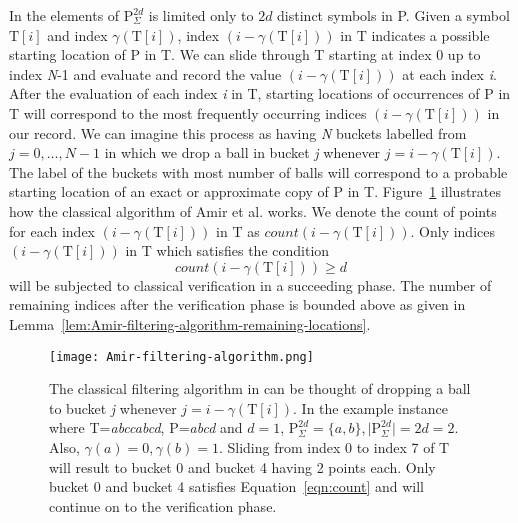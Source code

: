 In \cite{Amir2004} the elements of $\text{P}_{\Sigma}^{2d}$ is limited only to $2d$ distinct symbols in P. Given a symbol $\mathrm{T}[i]$ and index $\gamma(\mathrm{T}[i])$, index $(i - \gamma(\mathrm{T}[i]))$ in T indicates a possible starting location of P in T. We can slide through T starting at index 0 up to index \textit{N}-1 and evaluate and record the value $(i - \gamma(\mathrm{T}[i]))$ at each index \textit{i}. After the evaluation of each index \textit{i} in T, starting locations of occurrences of P in T will correspond to the most frequently occurring indices $(i - \gamma(\mathrm{T}[i]))$ in our record. We can imagine this process as having \textit{N} buckets labelled from $j=0,\ldots,N-1$ in which we drop a ball in bucket \textit{j} whenever $j=i-\gamma(\mathrm{T}[i])$. The label of the buckets with most number of balls will correspond to a probable starting location of an exact or approximate copy of P in T. Figure~\ref{fig:Amir-filtering-algorithm} illustrates how the classical algorithm of Amir et al. works. We denote the count of points for each index $(i - \gamma(\mathrm{T}[i]))$ in T as $count(i - \gamma(\mathrm{T}[i]))$. Only indices $(i - \gamma(\mathrm{T}[i]))$ in T which satisfies the condition
\begin{equation}\label{eqn:count}
	count(i - \gamma(\mathrm{T}[i])) \geq d
\end{equation}
will be subjected to classical verification in a succeeding phase. The number of remaining indices after the verification phase is bounded above as given in Lemma~\ref{lem:Amir-filtering-algorithm-remaining-locations}.

\begin{figure}[h!]
	\centering
	\texttt{[image: Amir-filtering-algorithm.png]}
	\caption{The classical filtering algorithm in \cite{Amir2004} can be thought of dropping a ball to bucket \textit{j} whenever $j=i - \gamma(\mathrm{T}[i])$. In the example instance where T=\textit{abccabcd}, P=\textit{abcd} and $d=1$, $\mathrm{P}_{\Sigma}^{2d} = \{a,b\}, \vert \mathrm{P}_{\Sigma}^{2d} \vert = 2d = 2$. Also, $\gamma(a)=0,\gamma(b)=1$. Sliding from index 0 to index 7 of T will result to bucket 0 and bucket 4 having 2 points each. Only bucket 0 and bucket 4 satisfies Equation~\ref{eqn:count} and will continue on to the verification phase.}
	\label{fig:Amir-filtering-algorithm}
\end{figure}

